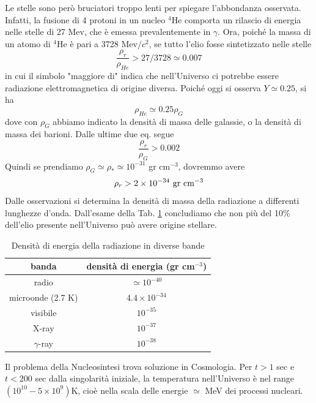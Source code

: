 Le stelle sono però bruciatori troppo lenti per spiegare l'abbondanza osservata.
Infatti, la fusione di 4 protoni in un nucleo $^4$He comporta un rilascio di
energia nelle stelle di 27 Mev, che è emessa prevalentemente in $\gamma$.  Ora,
poiché la massa di un atomo di $^4$He è pari a 3728 Mev$/c^2$, se tutto l'elio
fosse sintetizzato nelle stelle
\begin{equation}
  \frac{\rho_r}{\rho_{He}} > 27/3728 \simeq 0.007
\end{equation}
in cui il simbolo "maggiore di" indica che nell'Universo ci potrebbe essere
radiazione elettromagnetica di origine diversa.  Poiché oggi si osserva $Y
\simeq 0.25$, si ha
\begin{equation}
  \rho_{He} \simeq 0.25 \rho_G
\end{equation}
dove con $\rho_G$ abbiamo indicato la densità di massa delle galassie, o la
densità di massa dei barioni.  Dalle ultime due eq. segue
\begin{equation}
  \frac{\rho_r} {\rho_G} > 0.002
\end{equation}
Quindi se prendiamo $\rho_G \simeq \rho_* \simeq 10^{-31}$ gr cm$^{-3}$,
dovremmo avere
\begin{equation}
  \rho_r > 2 \times 10^{-34}~{\rm gr~ cm}^{-3}
\end{equation}
Dalle osservazioni si determina la densità di massa della radiazione a
differenti lunghezze d'onda.  Dall'esame della Tab. \ref{tab_den_rad_bande}
concludiamo che non più del 10\% dell'elio presente nell'Universo può avere
origine stellare.
\begin{table}
  \centering{}
  \caption{Densità di energia della radiazione in diverse bande}
  \label{tab_den_rad_bande}
  \begin{tabular}{cc}
    \toprule
    banda            & densità di energia {\rm (gr cm$^{-3}$)} \\
    \midrule
    radio             &  $\simeq          10^{-40} $  \\
    microonde (2.7 K) &  $     4.4 \times 10^{-34} $  \\
    visibile          &  $                10^{-35} $  \\
    X-ray             &  $                10^{-37} $  \\
    $\gamma$-ray      &  $                10^{-38} $  \\
    \bottomrule
  \end{tabular}
\end{table}
Il problema della Nucleosintesi trova soluzione in Cosmologia.  Per $t>1$ sec e
$t<200$ sec dalla singolarità iniziale, la temperatura nell'Universo è nel range
$(10^{10}-5 \times 10^{9})$K, cioè nella scala delle energie $\simeq$ MeV dei
processi nucleari.

